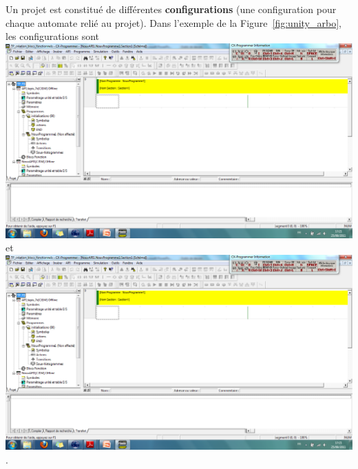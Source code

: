 \documentclass[11pt]{article}
\begin{document}
Un projet est constitué de différentes \textbf{configurations} (une configuration pour chaque automate relié au projet). Dans l'exemple de la Figure~\ref{fig:unity_arbo}, les configurations sont \includegraphics[trim = 40 582 1200 170, clip,height=\fontcharht\font`\B]{images/unity_arbo} et \includegraphics[trim = 40 296 1210 457, clip,height=\fontcharht\font`\B]{images/unity_arbo}.
\end{document}
